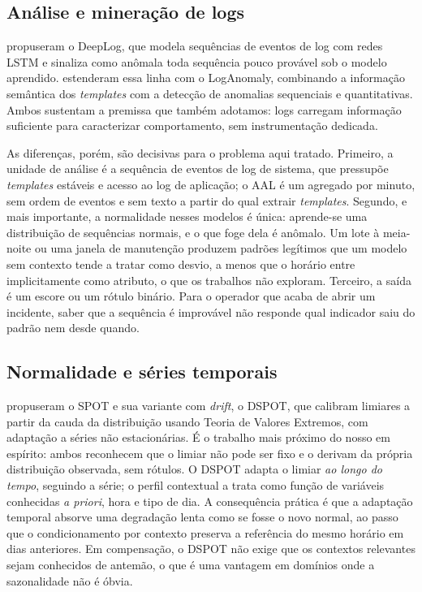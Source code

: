 \documentclass[sigconf,nonacm]{acmart}
\begin{document}
\subsection{Análise e mineração de logs}
\citet{du2017deeplog} propuseram o DeepLog, que modela sequências de eventos de log com redes LSTM e sinaliza como anômala toda sequência pouco provável sob o modelo aprendido. \citet{meng2019loganomaly} estenderam essa linha com o LogAnomaly, combinando a informação semântica dos \emph{templates} com a detecção de anomalias sequenciais e quantitativas. Ambos sustentam a premissa que também adotamos: logs carregam informação suficiente para caracterizar comportamento, sem instrumentação dedicada.

As diferenças, porém, são decisivas para o problema aqui tratado. Primeiro, a unidade de análise é a sequência de eventos de log de sistema, que pressupõe \emph{templates} estáveis e acesso ao log de aplicação; o AAL é um agregado por minuto, sem ordem de eventos e sem texto a partir do qual extrair \emph{templates}. Segundo, e mais importante, a normalidade nesses modelos é única: aprende-se uma distribuição de sequências normais, e o que foge dela é anômalo. Um lote à meia-noite ou uma janela de manutenção produzem padrões legítimos que um modelo sem contexto tende a tratar como desvio, a menos que o horário entre implicitamente como atributo, o que os trabalhos não exploram. Terceiro, a saída é um escore ou um rótulo binário. Para o operador que acaba de abrir um incidente, saber que a sequência é improvável não responde qual indicador saiu do padrão nem desde quando.

\subsection{Normalidade e séries temporais}
\citet{siffer2017dspot} propuseram o SPOT e sua variante com \emph{drift}, o DSPOT, que calibram limiares a partir da cauda da distribuição usando Teoria de Valores Extremos, com adaptação a séries não estacionárias. É o trabalho mais próximo do nosso em espírito: ambos reconhecem que o limiar não pode ser fixo e o derivam da própria distribuição observada, sem rótulos. O DSPOT adapta o limiar \emph{ao longo do tempo}, seguindo a série; o perfil contextual a trata como função de variáveis conhecidas \emph{a priori}, hora e tipo de dia. A consequência prática é que a adaptação temporal absorve uma degradação lenta como se fosse o novo normal, ao passo que o condicionamento por contexto preserva a referência do mesmo horário em dias anteriores. Em compensação, o DSPOT não exige que os contextos relevantes sejam conhecidos de antemão, o que é uma vantagem em domínios onde a sazonalidade não é óbvia.
\end{document}
